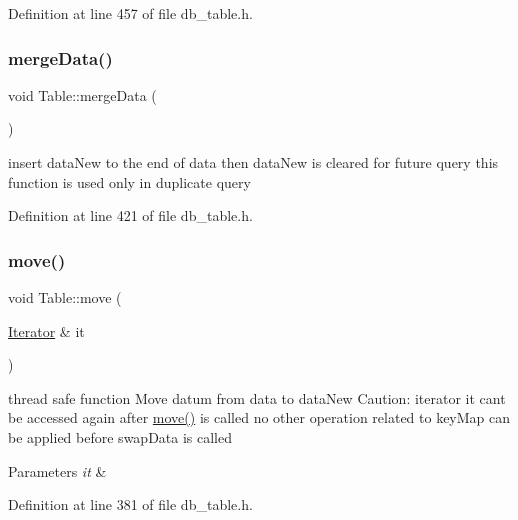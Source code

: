 Definition at line 457 of file db\+\_\+table.\+h.

\mbox{\label{class_table_a3b94156f321448e74ad74b0276ca1a32}} 
\subsubsection{\texorpdfstring{merge\+Data()}{mergeData()}}
{\footnotesize\ttfamily void Table\+::merge\+Data (\begin{DoxyParamCaption}{ }\end{DoxyParamCaption})\hspace{0.3cm}{\ttfamily [inline]}}

insert data\+New to the end of data then data\+New is cleared for future query this function is used only in duplicate query 

Definition at line 421 of file db\+\_\+table.\+h.

\mbox{\label{class_table_a2c4dc9ae2d3c20e2b20fab04b996ccc4}} 
\subsubsection{\texorpdfstring{move()}{move()}}
{\footnotesize\ttfamily void Table\+::move (\begin{DoxyParamCaption}\item[{\hyperlink{class_table_1_1_iterator_impl}{Iterator} \&}]{it }\end{DoxyParamCaption})\hspace{0.3cm}{\ttfamily [inline]}}

thread safe function Move datum from data to data\+New Caution\+: iterator it can\textquotesingle{}t be accessed again after \hyperlink{class_table_a2c4dc9ae2d3c20e2b20fab04b996ccc4}{move()} is called no other operation related to key\+Map can be applied before swap\+Data is called 
\begin{DoxyParams}{Parameters}
{\em it} & \\
\hline
\end{DoxyParams}


Definition at line 381 of file db\+\_\+table.\+h.

\mbox{\label{class_table_aac2cc68c2c50c66f7de7656fa495fc2a}} 
